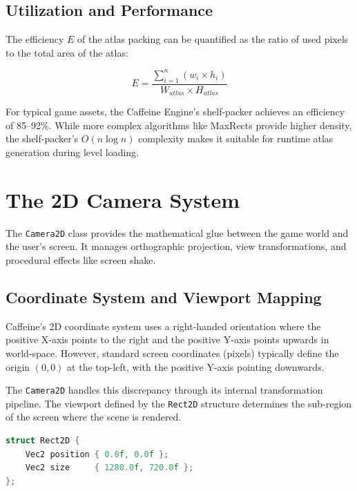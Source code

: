 \subsection{Utilization and Performance}

The efficiency $E$ of the atlas packing can be quantified as the ratio of used pixels to the total area of the atlas:

\begin{equation}
E = \frac{\sum_{i=1}^{n} (w_i \times h_i)}{W_{atlas} \times H_{atlas}}
\end{equation}

For typical game assets, the Caffeine Engine's shelf-packer achieves an efficiency of 85--92\%. While more complex algorithms like MaxRects provide higher density, the shelf-packer's $O(n \log n)$ complexity makes it suitable for runtime atlas generation during level loading.

\section{The 2D Camera System}

The \texttt{Camera2D} class provides the mathematical glue between the game world and the user's screen. It manages orthographic projection, view transformations, and procedural effects like screen shake.

\subsection{Coordinate System and Viewport Mapping}

Caffeine's 2D coordinate system uses a right-handed orientation where the positive X-axis points to the right and the positive Y-axis points upwards in world-space. However, standard screen coordinates (pixels) typically define the origin $(0,0)$ at the top-left, with the positive Y-axis pointing downwards.

The \texttt{Camera2D} handles this discrepancy through its internal transformation pipeline. The viewport defined by the \texttt{Rect2D} structure determines the sub-region of the screen where the scene is rendered.

\begin{lstlisting}[style=code, language=C++, caption={Viewport Definition}]
struct Rect2D {
    Vec2 position { 0.0f, 0.0f };
    Vec2 size     { 1280.0f, 720.0f };
};
\end{lstlisting}

